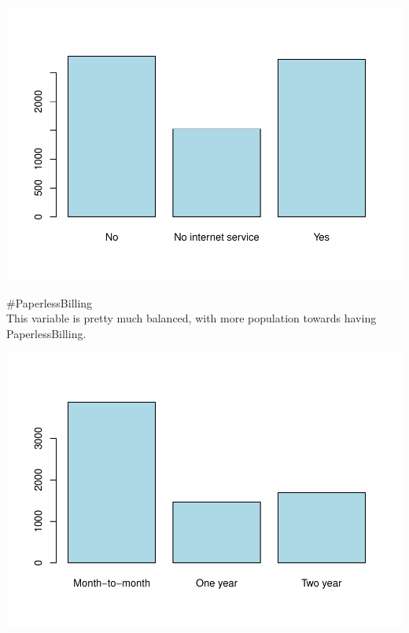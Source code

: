 \documentclass[
]{article}
\newenvironment{Shaded}{\begin{snugshade}}{\end{snugshade}}
\newcommand{\AttributeTok}[1]{\textcolor[rgb]{0.13,0.29,0.53}{#1}}
\newcommand{\CommentTok}[1]{\textcolor[rgb]{0.56,0.35,0.01}{\textit{#1}}}
\newcommand{\FunctionTok}[1]{\textcolor[rgb]{0.13,0.29,0.53}{\textbf{#1}}}
\newcommand{\NormalTok}[1]{#1}
\newcommand{\OtherTok}[1]{\textcolor[rgb]{0.56,0.35,0.01}{#1}}
\newcommand{\SpecialCharTok}[1]{\textcolor[rgb]{0.81,0.36,0.00}{\textbf{#1}}}
\newcommand{\StringTok}[1]{\textcolor[rgb]{0.31,0.60,0.02}{#1}}
\begin{document}
\includegraphics{Assignment2_script_files/figure-latex/unnamed-chunk-19-1.pdf}

\#PaperlessBilling\\
This variable is pretty much balanced, with more population towards
having PaperlessBilling.

\begin{Shaded}
\end{Shaded}

\includegraphics{Assignment2_script_files/figure-latex/unnamed-chunk-20-1.pdf}
\end{document}
